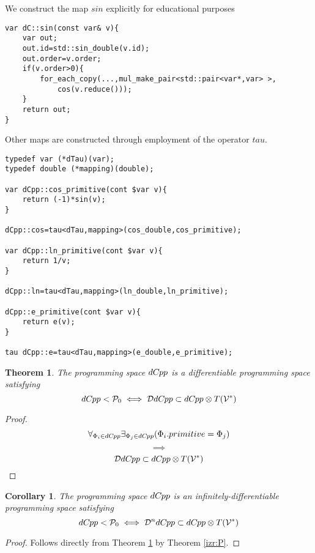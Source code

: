 \documentclass{article}
\newcommand{\VV}{\mathcal{V}}
\newcommand{\dP}{\mathcal{P}}
\newcommand{\DD}{\mathcal{D}}
\newcommand{\dCpp}{dC\nolinebreak\hspace{-.05em}\raisebox{.4ex}{\tiny\bf +}\nolinebreak\hspace{-.10em}\raisebox{.4ex}{\tiny\bf p}}
\def\dCpp{{dC\nolinebreak[4]\hspace{-.05em}pp}}
\newtheorem{izrek}{Theorem}[section]
\newtheorem{corollary}{Corollary}[section]
\begin{document}
We construct the map $sin$ explicitly for educational purposes

\begin{lstlisting}
var dC::sin(const var& v){
    var out;
    out.id=std::sin_double(v.id);
    out.order=v.order;
    if(v.order>0){
    	for_each_copy(...,mul_make_pair<std::pair<var*,var> >,
    		cos(v.reduce()));
    }
    return out;
}
\end{lstlisting}

Other maps are constructed through employment of the operator $tau$.


\begin{lstlisting}
typedef var (*dTau)(var);
typedef double (*mapping)(double);

var dCpp::cos_primitive(cont $var v){
    return (-1)*sin(v);
}

dCpp::cos=tau<dTau,mapping>(cos_double,cos_primitive);

var dCpp::ln_primitive(cont $var v){
    return 1/v;
}

dCpp::ln=tau<dTau,mapping>(ln_double,ln_primitive);

dCpp::e_primitive(cont $var v){
    return e(v);
}

tau dCpp::e=tau<dTau,mapping>(e_double,e_primitive);

\end{lstlisting}

\begin{izrek}\label{izr:dCpp}
The programming space $\dCpp$ is a differentiable programming space satisfying
\begin{equation}
\dCpp<\dP_0\iff \DD \dCpp\subset \dCpp\otimes T(\VV^*)
\end{equation}
\end{izrek}
\begin{proof}
\begin{equation}
\forall_{\Phi_i\in \dCpp}\exists_{\Phi_j\in \dCpp}(\Phi_i.primitive=\Phi_j)
\end{equation}
$$\implies$$
\begin{equation}
\DD \dCpp\subset \dCpp\otimes T(\VV^*)
\end{equation}
\end{proof}
\begin{corollary}
The programming space $\dCpp$ is an infinitely-differentiable programming space satisfying
\begin{equation}
\dCpp<\dP_0\iff \DD^n \dCpp\subset \dCpp\otimes T(\VV^*)
\end{equation}
\end{corollary}
\begin{proof}
Follows directly from Theorem \ref{izr:dCpp} by Theorem \ref{izr:P}.
\end{proof}
\end{document}
